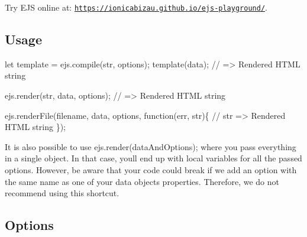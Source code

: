 Try E\+JS online at\+: \href{https://ionicabizau.github.io/ejs-playground/}{\tt https\+://ionicabizau.\+github.\+io/ejs-\/playground/}.

\subsection*{Usage}


\begin{DoxyCode}
let template = ejs.compile(str, options);
template(data);
// => Rendered HTML string

ejs.render(str, data, options);
// => Rendered HTML string

ejs.renderFile(filename, data, options, function(err, str)\{
    // str => Rendered HTML string
\});
\end{DoxyCode}


It is also possible to use {\ttfamily ejs.\+render(data\+And\+Options);} where you pass everything in a single object. In that case, you\textquotesingle{}ll end up with local variables for all the passed options. However, be aware that your code could break if we add an option with the same name as one of your data object\textquotesingle{}s properties. Therefore, we do not recommend using this shortcut.

\subsection*{Options}


